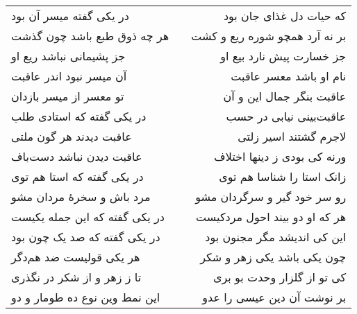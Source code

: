 \begin{center}
\begin{longtable}{l p{0.5cm} r}
در یکی گفته میسر آن بود
&&
که حیات دل غذای جان بود
\\
هر چه ذوق طبع باشد چون گذشت
&&
بر نه آرد همچو شوره ریع و کشت
\\
جز پشیمانی نباشد ریع او
&&
جز خسارت پیش نارد بیع او
\\
آن میسر نبود اندر عاقبت
&&
نام او باشد معسر عاقبت
\\
تو معسر از میسر بازدان
&&
عاقبت بنگر جمال این و آن
\\
در یکی گفته که استادی طلب
&&
عاقبت‌بینی نیابی در حسب
\\
عاقبت دیدند هر گون ملتی
&&
لاجرم گشتند اسیر زلتی
\\
عاقبت دیدن نباشد دست‌باف
&&
ورنه کی بودی ز دینها اختلاف
\\
در یکی گفته که استا هم توی
&&
زانک استا را شناسا هم توی
\\
مرد باش و سخرهٔ مردان مشو
&&
رو سر خود گیر و سرگردان مشو
\\
در یکی گفته که این جمله یکیست
&&
هر که او دو بیند احول مردکیست
\\
در یکی گفته که صد یک چون بود
&&
این کی اندیشد مگر مجنون بود
\\
هر یکی قولیست ضد هم‌دگر
&&
چون یکی باشد یکی زهر و شکر
\\
تا ز زهر و از شکر در نگذری
&&
کی تو از گلزار وحدت بو بری
\\
این نمط وین نوع ده طومار و دو
&&
بر نوشت آن دین عیسی را عدو
\\
\end{longtable}
\end{center}
